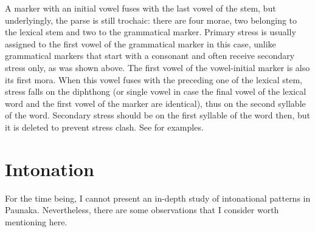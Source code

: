 A marker with an initial vowel fuses with the last vowel of the stem, but underlyingly, the parse is still trochaic: there are four morae, two belonging to the lexical stem and two to the grammatical marker. Primary stress is usually assigned to the first vowel of the grammatical marker in this case, unlike grammatical markers that start with a consonant and often receive secondary stress only, as was shown above. The first vowel of the vowel-initial marker is also its first mora. When this vowel fuses with the preceding one of the lexical stem, stress falls on the diphthong (or single vowel in case the final vowel of the lexical word and the first vowel of the marker are identical), thus on the second syllable of the word. Secondary stress should be on the first syllable of the word then, but it is deleted to prevent stress clash. See  for examples.

\begin{table}
\caption{Words with trochaic pattern in the underlying form}


\label{table:TrocheesSuf-2}
\end{table}



\section{Intonation} \label{sec:Intonation}
For the time being, I cannot present an in-depth study of intonational patterns in Paunaka. Nevertheless, there are some observations that I consider worth mentioning here.

